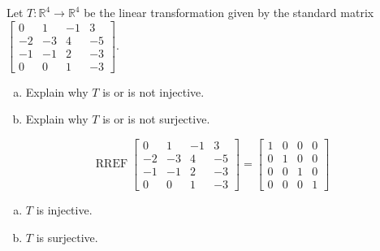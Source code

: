 
\begin{exerciseStatement}
 Let \(T:\mathbb{R}^ 4  \to \mathbb{R}^ 4 \) be the linear transformation given by the standard matrix \( \left[\begin{array}{cccc}
0 & 1 & -1 & 3 \\
-2 & -3 & 4 & -5 \\
-1 & -1 & 2 & -3 \\
0 & 0 & 1 & -3
\end{array}\right] .\)
\begin{enumerate}[(a)]
\item Explain why \(T\) is or is not injective.
\item Explain why \(T\) is or is not surjective.
\end{enumerate}
    
\end{exerciseStatement}
    
\begin{exerciseAnswer} 


\[\operatorname{RREF} \left[\begin{array}{cccc}
0 & 1 & -1 & 3 \\
-2 & -3 & 4 & -5 \\
-1 & -1 & 2 & -3 \\
0 & 0 & 1 & -3
\end{array}\right] = \left[\begin{array}{cccc}
1 & 0 & 0 & 0 \\
0 & 1 & 0 & 0 \\
0 & 0 & 1 & 0 \\
0 & 0 & 0 & 1
\end{array}\right] \]


\begin{enumerate}[(a)]
\item \(T\) is injective.
\item \(T\) is surjective.
\end{enumerate}
    
\end{exerciseAnswer}
    
